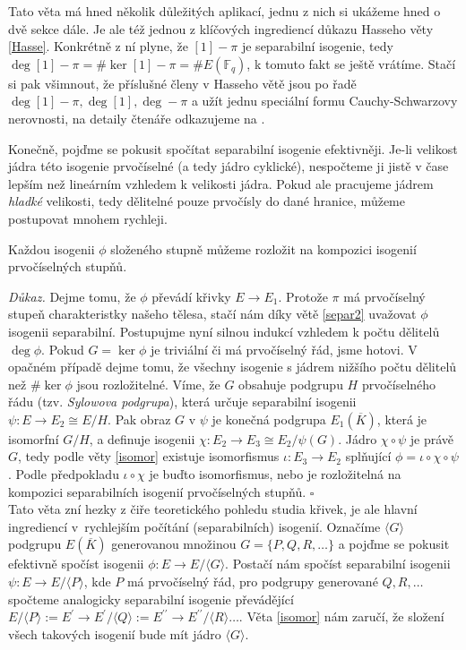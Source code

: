\documentclass[12pt]{report}
\begin{document}
\begin{poznamka}
Tato věta má hned několik důležitých aplikací, jednu z nich si ukážeme hned o dvě sekce dále. Je ale též jednou z klíčových ingrediencí důkazu Hasseho věty \ref{Hasse}. Konkrétně z ní plyne, že $[1]-\pi$ je separabilní isogenie, tedy $\deg [1]-\pi = \# \ker [1]-\pi = \# E(\mathbb{F}_q)$, k tomuto fakt se ještě vrátíme. Stačí si pak všimnout, že příslušné členy v Hasseho větě jsou po řadě $\deg [1] - \pi, \deg [1], \deg -\pi$ a užít jednu speciální formu Cauchy-Schwarzovy nerovnosti, na detaily čtenáře odkazujeme na \cite[Thm. V.1.1.]{Silverman}.
\end{poznamka}

Konečně, pojďme se pokusit spočítat separabilní isogenie efektivněji. Je-li velikost jádra této isogenie prvočíselné (a tedy jádro cyklické), nespočteme ji jistě v čase lepším než lineárním vzhledem k velikosti jádra. Pokud ale pracujeme jádrem \textit{hladké} velikosti, tedy dělitelné pouze prvočísly do dané hranice, můžeme postupovat mnohem rychleji. 

\begin{veta}\label{prvoo}
Každou isogenii $\phi$ složeného stupně můžeme rozložit na kompozici isogenií prvočíselných stupňů.
\end{veta}
\noindent \textit{Důkaz.} Dejme tomu, že  $\phi$ převádí křivky $E \longrightarrow E_1$. Protože $\pi$ má prvočíselný stupeň charakteristky našeho tělesa, stačí nám díky větě \ref{separ2} uvažovat $\phi$ isogenii separabilní. Postupujme nyní silnou indukcí vzhledem k počtu dělitelů $\deg \phi$. Pokud $G = \ker \phi$ je triviální či má prvočíselný řád, jsme hotovi. V opačném případě dejme tomu, že všechny isogenie s jádrem nižšího počtu dělitelů než $\# \ker \phi$ jsou rozložitelné. Víme, že $G$ obsahuje podgrupu $H$ prvočíselného řádu (tzv. \textit{Sylowova podgrupa}), která určuje separabilní isogenii $\psi : E \longrightarrow E_2 \cong E/H$. Pak obraz $G$ v $\psi$ je konečná podgrupa $E_1 (\overline{K})$, která je isomorfní $G/H$, a definuje isogenii $\chi : E_2 \longrightarrow E_3 \cong E_2/\psi(G)$. Jádro $\chi \circ \psi$ je právě $G$, tedy podle věty \ref{isomor} existuje isomorfismus $\iota : E_3 \longrightarrow E_2$ splňující $\phi = \iota \circ \chi \circ \psi$. Podle předpokladu $\iota \circ \chi$ je buďto isomorfismus, nebo je rozložitelná na kompozici separabilních isogenií prvočíselných stupňů. \hfill $\square$\\

Tato věta zní hezky z čiře teoretického pohledu studia křivek, je ale hlavní ingrediencí v~rychlejším počítání (separabilních) isogenií. Označíme $\langle G \rangle$ podgrupu $E(\overline{K})$ generovanou množinou $G = \lbrace P,Q,R,\dots \rbrace$ a pojďme se pokusit efektivně spočíst isogenii $\phi : E \longrightarrow E/ \langle G \rangle$. Postačí nám spočíst separabilní isogenii $\psi : E \longrightarrow E/\langle P \rangle$, kde $P$ má prvočíselný řád, pro podgrupy generované $Q,R, \dots$ spočteme analogicky separabilní isogenie převádějící $E/\langle P \rangle := E^\prime \longrightarrow E^\prime/\langle Q \rangle := E^{\prime \prime} \longrightarrow E^{\prime \prime}/\langle R \rangle \dots$. Věta \ref{isomor} nám zaručí, že složení všech takových isogenií bude mít jádro $\langle G \rangle$.
\end{document}
